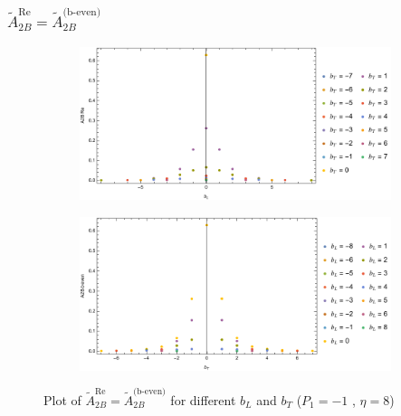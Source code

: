 \documentclass[]{article}
\numberwithin{equation}{section}
\newcommand{\tAmp}{\widetilde{A}}
\newcommand{\tAmp}{\ensuremath{\widetilde{A}^{(+)}}}
\begin{document}
\subsubsection{$\tAmp^{\text{Re}}_{2B}=\tAmp^{\text{(b-even)}}_{2B}$}
\begin{figure}[h!]
     \centering
     \begin{subfigure}[b]{0.45\textwidth}
         \centering
         \includegraphics[width=\textwidth]{Amp_plots/bL_A2B_b_even_P1_-1_eta_8.pdf}
     \end{subfigure}
     \begin{subfigure}[b]{0.45\textwidth}
         \centering
         \includegraphics[width=\textwidth]{Amp_plots/bT_A2B_b_even_P1_-1_eta_8.pdf}
     \end{subfigure}
        \caption{Plot of  $\tAmp^{\text{Re}}_{2B}=\tAmp^{\text{(b-even)}}_{2B}$ for different $b_{L}$ and $b_{T}$  ($P_{1} = -1$ , $\eta=8$)}
\end{figure}
\end{document}
